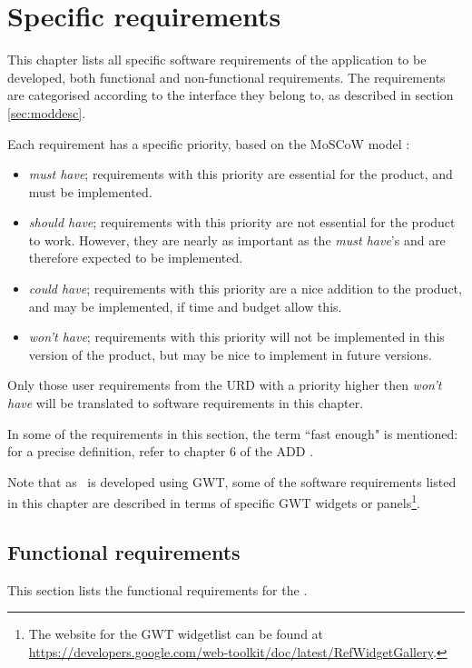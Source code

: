 \chapter{Specific requirements}
\label{chap:specreq}
This chapter lists all specific software requirements of the application to be developed, both functional and non-functional requirements. The requirements are categorised according to the interface they belong to, as described in section \ref{sec:moddesc}.

Each requirement has a specific priority, based on the MoSCoW model \cite{moscow}:

\begin{itemize}
    \item \emph{must have}; requirements with this priority are essential for the product, and must be implemented.
    \item \emph{should have}; requirements with this priority are not essential for the product to work. However, they are nearly as important as the \emph{must have}'s and are therefore expected to be implemented.
    \item \emph{could have}; requirements with this priority are a nice addition to the product, and may be implemented, if time and budget allow this.
    \item \emph{won't have}; requirements with this priority will not be implemented in this version of the product, but may be nice to implement in future versions.
\end{itemize}

\noindent Only those user requirements from the URD \cite{urd} with a priority higher then \emph{won't have} will be translated to software requirements in this chapter.

\fpstartparagraph{} In some of the requirements in this section, the term ``fast enough" is mentioned: for a precise definition, refer to chapter 6 of the ADD \cite{add}.

\fpstartparagraph{} Note that as \applicationname\ is developed using GWT, some of the software requirements listed in this chapter are described in terms of specific GWT widgets or panels\footnote{The website for the GWT widgetlist can be found at \url{https://developers.google.com/web-toolkit/doc/latest/RefWidgetGallery}.}.

\section{Functional requirements}
\label{sec:funcreq}
This section lists the functional requirements for the \applicationname.

